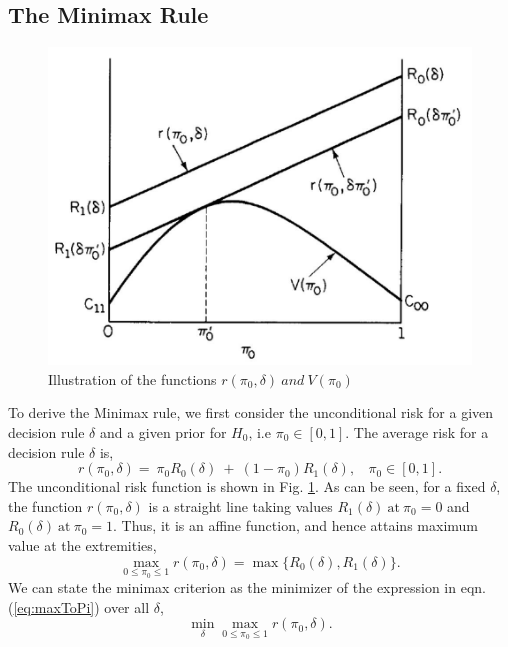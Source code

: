 \documentclass[a4paper,english,12pt]{article}
\begin{document}
\subsection{The Minimax Rule}
\begin{figure}[h]
	\centering
	\includegraphics[width=0.9\linewidth]{Figures/minimax1}
	\caption[abc]{Illustration of the functions $r(\pi_0,\delta)~and~V(\pi_0)$}
	\label{fig:minimax1}
\end{figure}
To derive the Minimax rule, we first consider the unconditional risk for a given decision rule $\delta$ and a given prior for $H_0$, i.e $\pi_0 \in [0,1]$. The average risk for a decision rule $\delta$ is,
\begin{equation}
r(\pi_0,\delta)=~\pi_0R_0(\delta)~+~(1-\pi_0)R_1(\delta), ~~~~\pi_0 \in [0,1].
\end{equation}
The unconditional risk function is shown in Fig. \ref{fig:minimax1}. As can be seen, for a fixed $\delta$, the function $r(\pi_0,\delta)$ is a straight line taking values $R_1(\delta)~\mbox{at}~\pi_0=0$ and $R_0(\delta)~\mbox{at}~\pi_0=1$. Thus, it is an affine function, and hence attains maximum value at the extremities,
\begin{equation}\label{eq:maxToPi}
	\mathop {\max }\limits_{0 \le {\pi _0} \le 1} r({\pi _0},\delta ) = \max\{ {R_0}(\delta ),{R_1}(\delta )\}.
\end{equation}
We can state the minimax criterion as the minimizer of the expression in eqn. (\ref{eq:maxToPi}) over all $\delta$,
\begin{equation}\label{eq:minMaxCrit}
		\mathop {\min}\limits_{\delta}\mathop {\max }\limits_{0 \le {\pi _0} \le 1} r({\pi _0},\delta ).
\end{equation}
\end{document}
